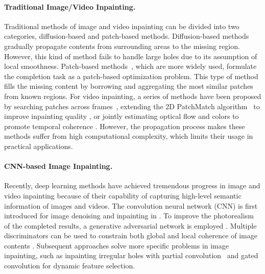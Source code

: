 \paragraph{Traditional Image/Video Inpainting.}
Traditional methods of image and video inpainting can be divided into two categories, diffusion-based and patch-based methods. 
Diffusion-based methods \cite{bertalmio2000image,ballester2001filling} gradually propagate contents from surrounding areas to the missing region. 
However, this kind of method fails to handle large holes due to its assumption of local smoothness. 
%
Patch-based methods~\cite{bertalmio2003simultaneous,efros2001image}, which are more widely used, formulate the completion task as a patch-based optimization problem. 
This type of method fills the missing content by borrowing and aggregating the most similar patches from known regions. 
%
For video inpainting, a series of methods have been proposed by searching patches across frames~\cite{patwardhan2007video}, extending the 2D PatchMatch algorithm~\cite{barnes2009patchmatch} to improve inpainting quality \cite{newson2014video}, or jointly estimating optical flow and colors to promote temporal coherence \cite{huang2016temporally}. 
However, the propagation process makes these methods suffer from high computational complexity, which limits their usage in practical applications. 

\paragraph{CNN-based Image Inpainting.}
Recently, deep learning methods have achieved tremendous progress in image and video inpainting because of their capability of capturing high-level semantic information of images and videos. 
%
The convolution neural network (CNN) is first introduced for image denoising and inpainting in \cite{xie2012image}. 
To improve the photorealism of the completed results, a generative adversarial network is employed \cite{pathak2016context}.
Multiple discriminators can be used to constrain both global and local coherence of image contents \cite{iizuka2017globally}. 
Subsequent approaches solve more specific problems in image inpainting, such as inpainting irregular holes with partial convolution~\cite{liu2018partialinpainting} and gated convolution \cite{yu2018free} for dynamic feature selection.
%
 

